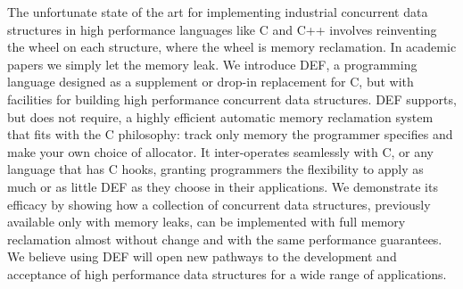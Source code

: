 The unfortunate state of the art for implementing industrial concurrent data structures in high performance languages like C and C++ involves reinventing the wheel on each structure, where the wheel is memory reclamation. In academic papers we simply let the memory leak. We introduce DEF, a programming language designed as a supplement or drop-in replacement for C, but with facilities for building high performance concurrent data structures.  DEF supports, but does not require, a highly efficient automatic memory reclamation system that fits with the C philosophy: track only memory the programmer specifies and make your own choice of allocator. It inter-operates seamlessly with C, or any language that has C hooks, granting programmers the flexibility to apply as much or as little DEF as they choose in their applications. We demonstrate its efficacy by showing how a collection of concurrent data structures, previously available only with memory leaks, can be implemented with full memory reclamation almost without change and with the same performance guarantees. We believe using DEF will open new pathways to the development and acceptance of high performance data structures for a wide range of applications.
